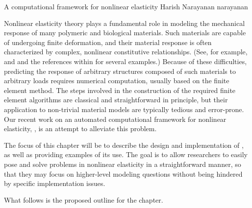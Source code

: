 \def\bone{{1}}
\def\Bepsilon{\mbox{$\epsilon$}}
\def\Bvarphi{\mbox{$\varphi$}}
\def\bB{\mbox{$ B$}}
\def\bC{\mbox{$ C$}}
\def\bE{\mbox{$ E$}}
\def\bF{\mbox{$ F$}}
\def\bN{\mbox{$ N$}}
\def\bP{\mbox{$ P$}}
\def\bS{\mbox{$ S$}}
\def\bT{\mbox{$ T$}}
\def\bX{\mbox{$ X$}}
\def\ba{\mbox{$ a$}}
\def\bb{\mbox{$ b$}}
\def\be{\mbox{$ e$}}
\def\bg{\mbox{$ g$}}
\def\br{\mbox{$ r$}}
\def\bu{\mbox{$ u$}}
\def\bv{\mbox{$ v$}}
\def\bw{\mbox{$ w$}}
\def\twist{\emp{CBC.Twist}}

              {A computational framework for nonlinear elasticity}
              {Harish Narayanan}
              {narayanan}

Nonlinear elasticity theory plays a fundamental role in modeling the
mechanical response of many polymeric and biological materials. Such
materials are capable of undergoing finite deformation, and their
material response is often characterized by complex, nonlinear
constitutive relationships. (See, for example, \citep{Holzapfel2000}
and \citep{TruesdellNoll1965} and the references within for several
examples.) Because of these difficulties, predicting the response of
arbitrary structures composed of such materials to arbitrary loads
requires numerical computation, usually based on the finite element
method. The steps involved in the construction of the required finite
element algorithms are classical and straightforward in principle, but
their application to non-trivial material models are typically tedious
and error-prone. Our recent work on an automated computational
framework for nonlinear elasticity, \twist, is an attempt to alleviate
this problem.

The focus of this chapter will be to describe the design and
implementation of \twist, as well as providing examples of its
use. The goal is to allow researchers to easily pose and solve
problems in nonlinear elasticity in a straightforward manner, so that
they may focus on higher-level modeling questions without being
hindered by specific implementation issues.

What follows is the proposed outline for the chapter.

